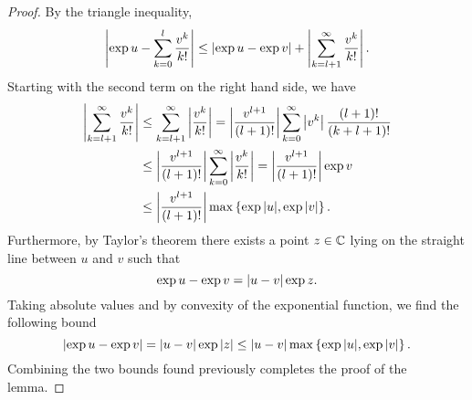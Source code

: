 
\begin{proof}
    By the triangle inequality,
    \begin{equation*}
        \left|\exp{u} - \sum_{k=0}^l \frac{v^k}{k!}\right| \leq \left|\exp{u} - \exp{v}\right| + \left|\sum_{k=l+1}^\infty \frac{v^k}{k!}\right|.
    \end{equation*}
    Starting with the second term on the right hand side, we have
    \begin{align*}
        \left|\sum_{k=l+1}^\infty \frac{v^k}{k!}\right| 
        & \leq \sum_{k=l+1}^\infty \left|\frac{v^k}{k!}\right| 
        = \left|\frac{v^{l+1}}{(l+1)!}\right| \sum_{k=0}^\infty \left|v^k\right| \frac{(l+1)!}{(k + l + 1)!} \\
        & \leq \left|\frac{v^{l+1}}{(l+1)!}\right| \sum_{k=0}^\infty \left|\frac{v^k}{k!}\right|
        = \left|\frac{v^{l+1}}{(l+1)!}\right| \exp v\\
        &\leq \left|\frac{v^{l+1}}{(l+1)!}\right| \max \left\{ \exp{|u|}, \exp{|v|} \right\}.
    \end{align*}
    Furthermore, by Taylor's theorem there exists a point $z \in \mathbb{C}$ lying on the straight line between $u$ and $v$ such that
    \begin{equation*}
        \exp u - \exp v = \left|u - v\right| \exp z.
    \end{equation*}
    Taking absolute values and by convexity of the exponential function, we find the following bound
    \begin{equation*}
        \left|\exp u - \exp v\right| = \left|u - v\right| \exp |z| \leq \left|u - v\right| \max \left\{ \exp{|u|}, \exp{|v|} \right\}.
    \end{equation*}
    Combining the two bounds found previously completes the proof of the lemma.
\end{proof}